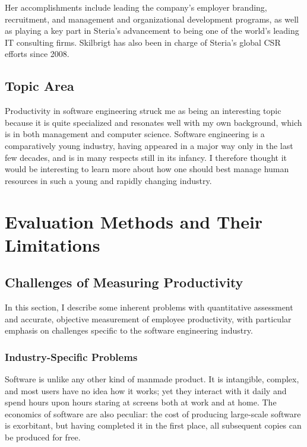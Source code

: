 \documentclass[letterpaper, 12pt]{report}
\begin{document}
Her accomplishments include leading the company's employer branding, recruitment, and management and organizational development programs, as well as playing a key part in Steria's advancement to being one of the world's leading IT consulting firms. 
Skilbrigt has also been in charge of Steria's global CSR efforts since 2008.


\section{Topic Area}
Productivity in software engineering struck me as being an interesting topic because it is quite specialized and resonates well with my own background, which is in both management and computer science.
Software engineering is a comparatively young industry, having appeared in a major way only in the last few decades, and is in many respects still in its infancy.
I therefore thought it would be interesting to learn more about how one should best manage human resources in such a young and rapidly changing industry.






\chapter{Evaluation Methods and Their Limitations}

\section{Challenges of Measuring Productivity}
In this section, I describe some inherent problems with quantitative assessment and accurate, objective measurement of employee productivity, with particular emphasis on challenges specific to the software engineering industry.


\subsection{Industry-Specific Problems}
Software is unlike any other kind of manmade product. 
It is intangible, complex, and most users have no idea how it works; yet they interact with it daily and spend hours upon hours staring at screens both at work and at home. 
The economics of software are also peculiar: the cost of producing large-scale software is exorbitant, but having completed it in the first place, all subsequent copies can be produced for free. 
\end{document}
